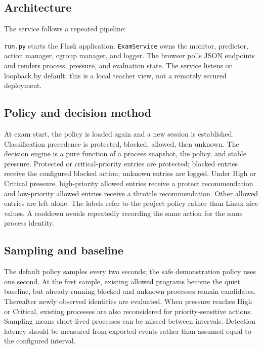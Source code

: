 \documentclass[12pt,a4paper]{article}
\newcommand{\code}[1]{\texttt{#1}}
\begin{document}
\subsection{Architecture}
The service follows a repeated pipeline:
\begin{center}
\end{center}
\code{run.py} starts the Flask application. \code{ExamService} owns the monitor, predictor, action manager, cgroup manager, and logger. The browser polls JSON endpoints and renders process, pressure, and evaluation state. The service listens on loopback by default; this is a local teacher view, not a remotely secured deployment.

\subsection{Policy and decision method}
At exam start, the policy is loaded again and a new session is established. Classification precedence is protected, blocked, allowed, then unknown. The decision engine is a pure function of a process snapshot, the policy, and stable pressure. Protected or critical-priority entries are protected; blocked entries receive the configured blocked action; unknown entries are logged. Under High or Critical pressure, high-priority allowed entries receive a protect recommendation and low-priority allowed entries receive a throttle recommendation. Other allowed entries are left alone. The labels refer to the project policy rather than Linux nice values. A cooldown avoids repeatedly recording the same action for the same process identity.

\subsection{Sampling and baseline}
The default policy samples every two seconds; the safe demonstration policy uses one second. At the first sample, existing allowed programs become the quiet baseline, but already-running blocked and unknown processes remain candidates. Thereafter newly observed identities are evaluated. When pressure reaches High or Critical, existing processes are also reconsidered for priority-sensitive actions. Sampling means short-lived processes can be missed between intervals. Detection latency should be measured from exported events rather than assumed equal to the configured interval.
\end{document}
